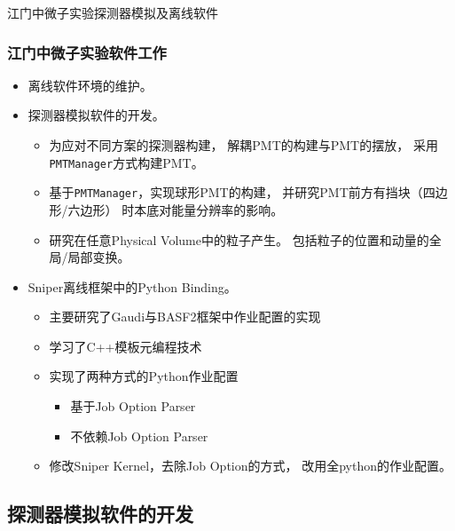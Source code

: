 \begin{frame}
    \begin{center}
        \LARGE 江门中微子实验探测器模拟及离线软件
    \end{center}
\end{frame}

\begin{frame}
    \frametitle{江门中微子实验软件工作}
    \begin{itemize}
        \item 离线软件环境的维护。
        \item 探测器模拟软件的开发。
            \begin{itemize}
                \item 为应对不同方案的探测器构建，
                      解耦PMT的构建与PMT的摆放，
                      采用{\tt PMTManager}方式构建PMT。
                \item 基于{\tt PMTManager}，实现球形PMT的构建，
                      并研究PMT前方有挡块（四边形/六边形）
                      时本底对能量分辨率的影响。
                \item 研究在任意Physical Volume中的粒子产生。
                      包括粒子的位置和动量的全局/局部变换。
            \end{itemize}
        \item Sniper离线框架中的Python Binding。
            \begin{itemize}
                \item 主要研究了Gaudi与BASF2框架中作业配置的实现
                \item 学习了C++模板元编程技术
                \item 实现了两种方式的Python作业配置
                    \begin{itemize}
                        \item 基于Job Option Parser
                        \item 不依赖Job Option Parser
                    \end{itemize}
                \item 修改Sniper Kernel，去除Job Option的方式，
                      改用全python的作业配置。
            \end{itemize}
    \end{itemize}
\end{frame}

\subsection{探测器模拟软件的开发}

